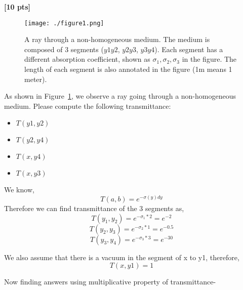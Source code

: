 \documentclass[11pt,addpoints,answers]{exam}
\begin{document}
\begin{questions}
\question \textbf{[10 pts]}
\begin{figure}[h]
    \centering
    \texttt{[image: ./figure1.png]}
    \caption{A ray through a non-homogeneous medium. The medium is composed of 3 segments ($y1y2$, $y2y3$, $y3y4$). Each segment has a different absorption coefficient, shown as $\sigma_1, \sigma_2, \sigma_3$ in the figure. The length of each segment is also annotated in the figure (1m means 1 meter).}
    \label{fig:q1}
\end{figure}

As shown in Figure~\ref{fig:q1}, we observe a ray going through a non-homogeneous medium. 
Please compute the following transmittance:
\begin{itemize}
    \item $T(y1, y2)$
    \item  $T(y2, y4)$
    \item $T(x, y4)$
    \item $T(x, y3)$
\end{itemize} 



\begin{tcolorbox}[fit,height=20cm, width=\textwidth, blank, borderline={0.5pt}{-2pt},halign=left, valign=center, nobeforeafter]


\begin{studentsolution}

We know,
\begin{equation}
    T(a, b) = e^{- \sigma(y) dy }
\end{equation}
Therefore we can find transmittance of the 3 segments as,
\begin{equation}
    T(y_1, y_2) = e^{- \sigma_1 * 2} = e^{-2}
\end{equation}
\begin{equation}
    T(y_2, y_3) = e^{- \sigma_2 * 1} = e^{-0.5}
\end{equation}
\begin{equation}
    T(y_3, y_4) = e^{- \sigma_3 * 3} = e^{-30}
\end{equation}

We also assume that there is a vacuum in the segment of x to y1, therefore,
\begin{equation}
    T(x, y1) = 1
\end{equation}

Now finding answers using multiplicative property of transmittance- 


\end{studentsolution}
\end{tcolorbox}
\end{questions}
\end{document}
